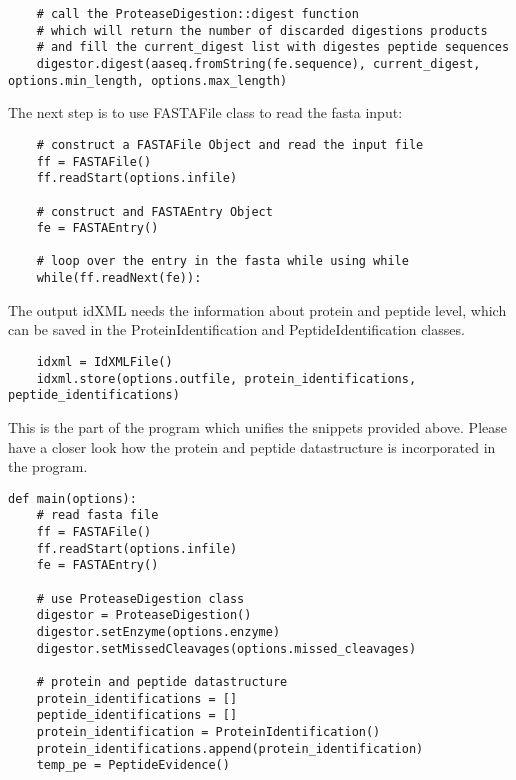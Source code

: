 {\begin{listing}
\begin{verbatim}
    # call the ProteaseDigestion::digest function
    # which will return the number of discarded digestions products  
    # and fill the current_digest list with digestes peptide sequences
    digestor.digest(aaseq.fromString(fe.sequence), current_digest, options.min_length, options.max_length)
\end{verbatim}
\end{listing}

\noindent The next step is to use FASTAFile class to read the fasta input:
\begin{listing}
\begin{verbatim}
    # construct a FASTAFile Object and read the input file
    ff = FASTAFile()
    ff.readStart(options.infile)
    
    # construct and FASTAEntry Object 
    fe = FASTAEntry()
    
    # loop over the entry in the fasta while using while
    while(ff.readNext(fe)): 
\end{verbatim}
\end{listing}

\noindent The output idXML needs the information about protein and peptide level, which can be saved in the ProteinIdentification and PeptideIdentification classes. 
\begin{listing}
\begin{verbatim}
    idxml = IdXMLFile()
    idxml.store(options.outfile, protein_identifications, peptide_identifications)
\end{verbatim}
\end{listing}

\noindent This is the part of the program which unifies the snippets provided above. Please have a closer look how the protein and peptide datastructure is incorporated in the program. 

\begin{listing}
\begin{verbatim}
def main(options):
    # read fasta file  
    ff = FASTAFile()
    ff.readStart(options.infile)
    fe = FASTAEntry()

    # use ProteaseDigestion class 
    digestor = ProteaseDigestion()
    digestor.setEnzyme(options.enzyme)
    digestor.setMissedCleavages(options.missed_cleavages)

    # protein and peptide datastructure
    protein_identifications = []
    peptide_identifications = []
    protein_identification = ProteinIdentification()
    protein_identifications.append(protein_identification)
    temp_pe = PeptideEvidence()


\end{verbatim}
\end{listing}}
